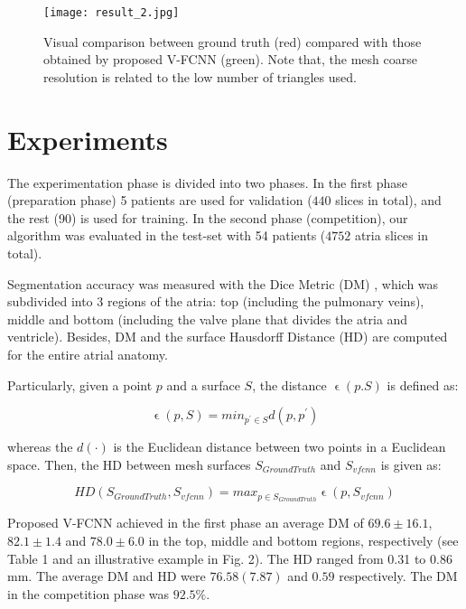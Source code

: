 \documentclass{llncs}
\begin{document}
\begin{figure*}[ht]
\centering
 \texttt{[image: result\_2.jpg]}
   \caption{Visual comparison between ground truth  (red) compared with those obtained by proposed V-FCNN (green). Note that, the mesh coarse resolution is related to the low number of triangles used.}
\label{fig:result_2}
\end{figure*}


\section{Experiments}

The experimentation phase is divided into two phases. In the first phase (preparation phase) 5 patients are used for validation ($440$ slices in total), and the rest (90) is used for training. In the second phase (competition), our algorithm was evaluated in the test-set with 54 patients ($4752$ atria slices in total).

Segmentation accuracy was measured with the Dice Metric (DM) \cite{Avendi}, which was subdivided into 3 regions of the atria: top (including the pulmonary veins), middle and bottom (including the valve plane that divides the atria and ventricle). Besides, DM and the surface Hausdorff Distance (HD) \cite{Cignoni} are computed for the entire atrial anatomy.

Particularly, given a point $p$ and a surface $S$, the distance $\upvarepsilon(p.S)$ is defined as:

\begin{equation}
\upvarepsilon(p,S)= min_{p^{'} \in S} d(p,p^{'})
\end{equation}

whereas the $d(\cdot)$ is the Euclidean distance between two points in a Euclidean space.
Then, the HD between mesh surfaces $S_{GroundTruth}$ and $S_{vfcnn}$ is given as:

\begin{equation}
HD(S_{GroundTruth},S_{vfcnn}) = max_{p \in S_{GroundTruth}} \upvarepsilon(p,S_{vfcnn})
\end{equation}


Proposed V-FCNN achieved in the first phase an average DM of $69.6 \pm 16.1$, $82.1 \pm 1.4$ and $78.0 \pm 6.0$ in the top, middle and bottom regions, respectively (see Table 1 and an illustrative example in Fig. 2). The HD ranged from 0.31 to 0.86 mm. The average DM and HD were $76.58(7.87)$ and $0.59$ respectively. The DM in the competition phase was $92.5\%$.
\end{document}

